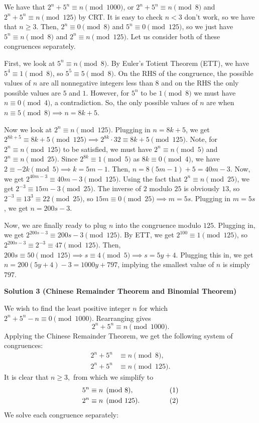\begin{enumerate}
We have that $2^n + 5^n \equiv n\pmod{1000}$, or $2^n + 5^n \equiv n \pmod{8}$ and $2^n + 5^n \equiv n \pmod{125}$ by CRT. It is easy to check $n < 3$ don't work, so we have that $n \geq 3$. Then, $2^n \equiv 0 \pmod{8}$ and $5^n \equiv 0 \pmod{125}$, so we just have $5^n \equiv n \pmod{8}$ and $2^n \equiv n \pmod{125}$. Let us consider both of these congruences separately.

 First, we look at $5^n \equiv n \pmod{8}$. By Euler's Totient Theorem (ETT), we have $5^4 \equiv 1 \pmod{8}$, so $5^5 \equiv 5 \pmod{8}$. On the RHS of the congruence, the possible values of $n$ are all nonnegative integers less than $8$ and on the RHS the only possible values are $5$ and $1$. However, for $5^n$ to be $1 \pmod{8}$ we must have $n \equiv 0 \pmod{4}$, a contradiction. So, the only possible values of $n$ are when $n \equiv 5 \pmod{8} \implies n = 8k+5$.

 Now we look at $2^n \equiv n \pmod{125}$. Plugging in $n = 8k+5$, we get $2^{8k+5} \equiv 8k+5 \pmod{125} \implies 2^{8k} \cdot 32 \equiv 8k+5 \pmod{125}$. Note, for $2^n \equiv n\pmod{125}$ to be satisfied, we must have $2^n \equiv n \pmod{5}$ and $2^n \equiv n\pmod{25}$. Since $2^{8k} \equiv 1\pmod{5}$ as $8k \equiv 0\pmod{4}$, we have $2 \equiv -2k \pmod{5} \implies k = 5m-1$. Then, $n = 8(5m-1) + 5 = 40m-3$. Now, we get $2^{40m-3} \equiv 40m-3 \pmod{125}$. Using the fact that $2^n \equiv n\pmod{25}$, we get $2^{-3} \equiv 15m-3 \pmod{25}$. The inverse of $2$ modulo $25$ is obviously $13$, so $2^{-3} \equiv 13^3 \equiv 22 \pmod{25}$, so $15m \equiv 0 \pmod{25} \implies m = 5s$. Plugging in $m = 5s$, we get $n = 200s - 3$.

 Now, we are finally ready to plug $n$ into the congruence modulo $125$. Plugging in, we get $2^{200s-3} \equiv 200s - 3 \pmod{125}$. By ETT, we get $2^{100} \equiv 1 \pmod{125}$, so $2^{200s- 3} \equiv 2^{-3} \equiv 47 \pmod{125}$. Then, $200s \equiv 50 \pmod{125} \implies s \equiv 4 \pmod{5} \implies s = 5y+4$. Plugging this in, we get $n = 200(5y+4) - 3 = 1000y+797$, implying the smallest value of $n$ is simply $\boxed{797}$. 

 



\textbf{Solution 3 (Chinese Remainder Theorem and Binomial Theorem)}

We wish to find the least positive integer $n$ for which $2^n+5^n-n\equiv0\pmod{1000}.$ Rearranging gives 
 \[2^n+5^n\equiv n\pmod{1000}.\] Applying the Chinese Remainder Theorem, we get the following system of congruences:
 \begin{align*} 2^n+5^n &\equiv n \pmod{8}, \\ 2^n+5^n &\equiv n \pmod{125}. \end{align*}
It is clear that $n\geq3,$ from which we simplify to 
 \begin{align*} 5^n &\equiv n \pmod{8}, \hspace{15mm} &(1) \\ 2^n &\equiv n \pmod{125}. &(2) \end{align*}
We solve each congruence separately:


\end{enumerate}
